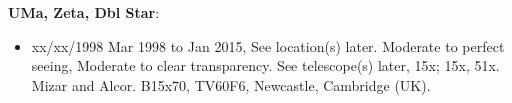 {\bf UMa, Zeta, Dbl Star}:
\begin{itemize}
\item xx/xx/1998 Mar 1998 to Jan 2015, See location(s) later. Moderate to perfect seeing, Moderate to clear transparency. See telescope(s) later, 15x; 15x, 51x. Mizar and Alcor. B15x70, TV60F6, Newcastle, Cambridge (UK).
\end{itemize}
